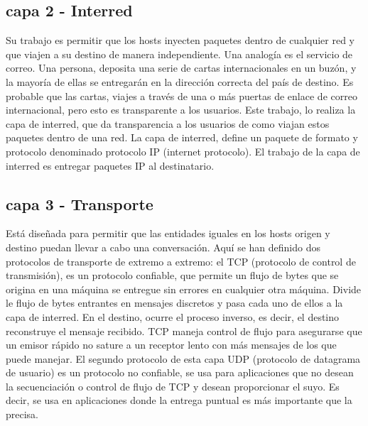 \subsection{capa 2 - Interred  }
Su trabajo es permitir que los hosts inyecten paquetes dentro de cualquier red y que viajen a su destino de manera independiente. Una analogía es el servicio de correo. Una persona, deposita una serie de cartas internacionales en un buzón, y la mayoría de ellas se entregarán en la dirección correcta del país de destino. Es probable que las cartas, viajes a través de una o más puertas de enlace de correo internacional, pero esto es transparente a los usuarios. Este trabajo, lo realiza la capa de interred, que da transparencia a los usuarios de como viajan estos paquetes dentro de una red. 
La capa de interred, define un paquete de formato y protocolo denominado protocolo IP (internet protocolo). El trabajo de la capa de interred es entregar paquetes IP al destinatario. 

\subsection{capa 3 - Transporte}
Está diseñada para permitir que las entidades iguales en los hosts origen y destino puedan llevar a cabo una conversación. Aquí se han definido dos protocolos de transporte de extremo a extremo: el TCP (protocolo de control de transmisión), es un protocolo confiable, que permite un flujo de bytes que se origina en una máquina se entregue sin errores en cualquier otra máquina. Divide le flujo de bytes entrantes en mensajes discretos y pasa cada uno de ellos a la capa de interred. En el destino, ocurre el proceso inverso, es decir, el destino reconstruye el mensaje recibido. TCP maneja control de flujo para asegurarse que un emisor rápido no sature a un receptor lento con más mensajes de los que puede manejar. 
El segundo protocolo de esta capa UDP (protocolo de datagrama de usuario) es un protocolo no confiable, se usa para aplicaciones que no desean la secuenciación o control de flujo de TCP y desean proporcionar el suyo. Es decir, se usa en aplicaciones donde la entrega puntual es más importante que la precisa. 



